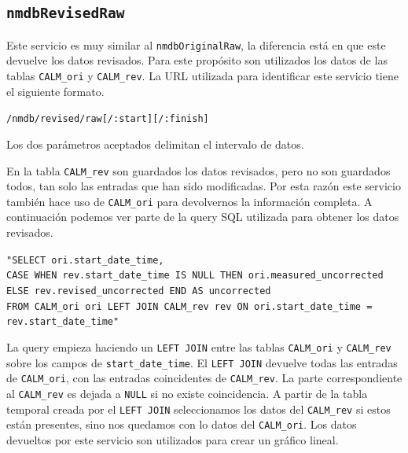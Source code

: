 	\subsection{\texttt{nmdbRevisedRaw}}
		Este servicio es muy similar al \texttt{nmdbOriginalRaw}, la diferencia está en que este devuelve los datos revisados. Para este
		propósito son utilizados los datos de las tablas \texttt{CALM\_ori} y \texttt{CALM\_rev}. La URL utilizada para identificar este
		servicio tiene el siguiente formato.
	  		\begin{center} \texttt{/nmdb/revised/raw[/:start][/:finish]}  \end{center} 
		Los dos parámetros aceptados delimitan el intervalo de datos.
		\par
		En la tabla \texttt{CALM\_rev} son guardados los datos revisados, pero no son guardados todos, tan solo las entradas que han sido
		modificadas. Por esta razón este servicio también hace uso de \texttt{CALM\_ori} para devolvernos la información completa. A
		continuación podemos ver parte de la query SQL utilizada para obtener los datos revisados.
			\begin{center} \texttt{"SELECT ori.start\_date\_time,
			  		\\	CASE WHEN rev.start\_date\_time IS NULL THEN ori.measured\_uncorrected ELSE rev.revised\_uncorrected END AS uncorrected 
					\\	FROM CALM\_ori ori LEFT JOIN CALM\_rev rev ON ori.start\_date\_time = rev.start\_date\_time"}
			\end{center} 
		La query empieza haciendo un \texttt{LEFT JOIN} entre las tablas \texttt{CALM\_ori} y \texttt{CALM\_rev} sobre los campos de
		\texttt{start\_date\_time}. El \texttt{LEFT JOIN} devuelve todas las entradas de \texttt{CALM\_ori}, con las entradas coincidentes de
		\texttt{CALM\_rev}. La parte correspondiente al \texttt{CALM\_rev} es dejada a \texttt{NULL} si no existe coincidencia. A partir de la
		tabla temporal creada por el \texttt{LEFT JOIN} seleccionamos los datos del \texttt{CALM\_rev} si estos están presentes, sino nos
		quedamos con lo datos del \texttt{CALM\_ori}. Los datos devueltos por este servicio son utilizados para crear un gráfico lineal.
